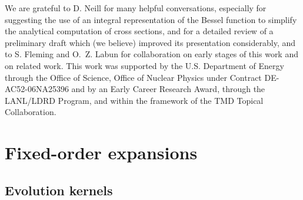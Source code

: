 \documentclass[a4,letterpaper,11pt]{article}
\begin{document}
\begin{acknowledgments}
We are grateful to D. Neill for many helpful conversations, especially for suggesting the use of an integral representation of the Bessel function to simplify the analytical computation of cross sections, and for a detailed review of a preliminary draft which (we believe) improved its presentation considerably, and to S. Fleming and O.~Z. Labun for collaboration on early stages of this work and on related work. This work was supported by the U.S. Department of Energy through the Office of Science, Office of Nuclear Physics under Contract DE-AC52-06NA25396 and by an Early Career Research Award, through the LANL/LDRD Program, and within the framework of the TMD Topical Collaboration.

\end{acknowledgments}


\appendix

\section{Fixed-order expansions}
\label{app:fixedorder}

\subsection{Evolution kernels}
\label{app:def-K}
\end{document}
